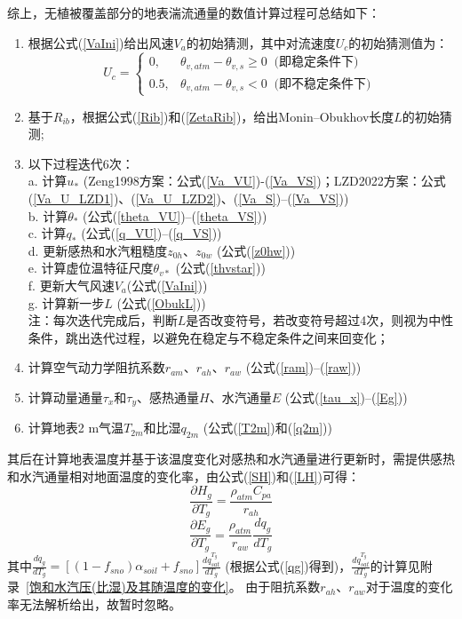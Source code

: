 综上，无植被覆盖部分的地表湍流通量的数值计算过程可总结如下：
\begin{enumerate}
     \item 根据公式(\ref{VaIni})给出风速$V_{a}$的初始猜测，其中对流速度$U_c$的初始猜测值为：
       \begin{equation}
          U_{c}= \begin{cases}
           0, & \theta_{v, atm}-\theta_{v, s} \geq 0\ \text { (即稳定条件下) } \\ 
           0.5, & \theta_{v, atm}-\theta_{v, s}<0\ \text { (即不稳定条件下) }
          \end{cases}
       \end{equation}
     \item 基于$R_{ib}$，根据公式(\ref{Rib})和(\ref{ZetaRib})，给出Monin--Obukhov长度$L$的初始猜测;
     \item 以下过程迭代6次：\\
     a. 计算$u_\ast$ (Zeng1998方案：公式(\ref{Va_VU})-(\ref{Va_VS})；LZD2022方案：公式(\ref{Va_U_LZD1})、(\ref{Va_U_LZD2})、(\ref{Va_S})--(\ref{Va_VS})) \\
     b. 计算$\theta_\ast$ (公式(\ref{theta_VU})--(\ref{theta_VS})) \\
     c. 计算$q_\ast$ (公式(\ref{q_VU})--(\ref{q_VS})) \\
     d. 更新感热和水汽粗糙度$z_{0h}$、$z_{0w}$ (公式(\ref{z0hw})) \\
     e. 计算虚位温特征尺度$\theta_{v\ast}$ (公式(\ref{thvstar})) \\
     f. 更新大气风速$V_a$(公式(\ref{VaIni})) \\
     g. 计算新一步$L$ (公式(\ref{ObukL})) \\
     注：每次迭代完成后，判断$L$是否改变符号，若改变符号超过4次，则视为中性条件，跳出迭代过程，以避免在稳定与不稳定条件之间来回变化；
     \item 计算空气动力学阻抗系数$r_{am}$、$r_{ah}$、$r_{aw}$ (公式(\ref{ram})--(\ref{raw}))
     \item 计算动量通量$\tau_{x}$和$\tau_{y}$、感热通量$H$、水汽通量$E$ (公式(\ref{tau_x})--(\ref{Eg}))
     \item 计算地表2 m气温$T_{2m}$和比湿$q_{2m}$ (公式(\ref{T2m})和(\ref{q2m}))
 \end{enumerate}

 其后在计算地表温度并基于该温度变化对感热和水汽通量进行更新时，需提供感热和水汽通量相对地面温度的变化率，由公式(\ref{SH})和(\ref{LH})可得：
\begin{equation}
     \frac{\partial H_{g}}{\partial T_{g}}=\frac{\rho_{atm} C_{p a}}{r_{a h}}
\end{equation}
\begin{equation}\label{Eg/Tg_1}
     \frac{\partial E_{g}}{\partial T_{g}}= \frac{\rho_{atm}}{r_{a w}} \frac{d q_{g}}{d T_{g}}
\end{equation}
其中$\frac{dq_g}{dT_g}=\left[\left(1-f_{sno}\right)\alpha_{soil}+f_{sno}\right]\frac{dq_{sat}^{T_g}}{dT_g}$ (根据公式(\ref{qg})得到)，$\frac{dq_{sat}^{T_g}}{dT_g}$的计算见附录~\ref{饱和水汽压(比湿)及其随温度的变化}。
由于阻抗系数$r_{ah}$、$r_{aw}$对于温度的变化率无法解析给出，故暂时忽略。



